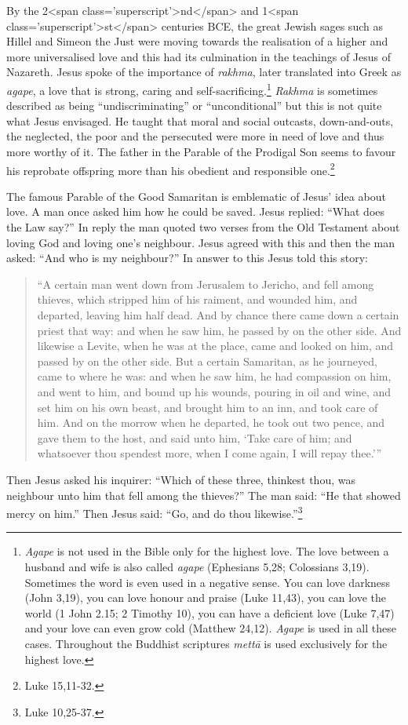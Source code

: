 \documentclass[10pt, openright]{book}
\begin{document}
By the 2<span class='superscript'>nd</span> and 1<span class='superscript'>st</span> centuries BCE, the great Jewish sages such as Hillel and Simeon the Just were moving towards the realisation of a higher and more universalised love and this had its culmination in the teachings of Jesus of Nazareth. Jesus spoke of the importance of \textit{rakhma}, later translated into Greek as \textit{agape}, a love that is strong, caring and self-sacrificing.\footnote {\textit{Agape} is not used in the Bible only for the highest love. The love between a husband and wife is also called \textit{agape} (Ephesians 5,28; Colossians 3,19). Sometimes the word is even used in a negative sense. You can love darkness (John 3,19), you can love honour and praise (Luke 11,43), you can love the world (1 John 2.15; 2 Timothy 10), you can have a deficient love (Luke 7,47) and your love can even grow cold (Matthew 24,12). \textit{Agape} is used in all these cases. Throughout the Buddhist scriptures \textit{mettā} is used exclusively for the highest love.} \textit{Rakhma} is sometimes described as being “undiscriminating” or “unconditional” but this is not quite what Jesus envisaged. He taught that moral and social outcasts, down-and-outs, the neglected, the poor and the persecuted were more in need of love and thus more worthy of it. The father in the Parable of the Prodigal Son seems to favour his reprobate offspring more than his obedient and responsible one.\footnote {Luke 15,11-32.}


The famous Parable of the Good Samaritan is emblematic of Jesus’ idea about love. A man once asked him how he could be saved. Jesus replied: “What does the Law say?” In reply the man quoted two verses from the Old Testament about loving God and loving one’s neighbour. Jesus agreed with this and then the man asked: “And who is my neighbour?” In answer to this Jesus told this story:


\begin{quote}


“A certain man went down from Jerusalem to Jericho, and fell among thieves, which stripped him of his raiment, and wounded him, and departed, leaving him half dead. And by chance there came down a certain priest that way: and when he saw him, he passed by on the other side. And likewise a Levite, when he was at the place, came and looked on him, and passed by on the other side. But a certain Samaritan, as he journeyed, came to where he was: and when he saw him, he had compassion on him, and went to him, and bound up his wounds, pouring in oil and wine, and set him on his own beast, and brought him to an inn, and took care of him. And on the morrow when he departed, he took out two pence, and gave them to the host, and said unto him, ‘Take care of him; and whatsoever thou spendest more, when I come again, I will repay thee.’”




\end{quote}
Then Jesus asked his inquirer: “Which of these three, thinkest thou, was neighbour unto him that fell among the thieves?” The man said: “He that showed mercy on him.” Then Jesus said: “Go, and do thou likewise.”\footnote {Luke 10,25-37.}
\end{document}
